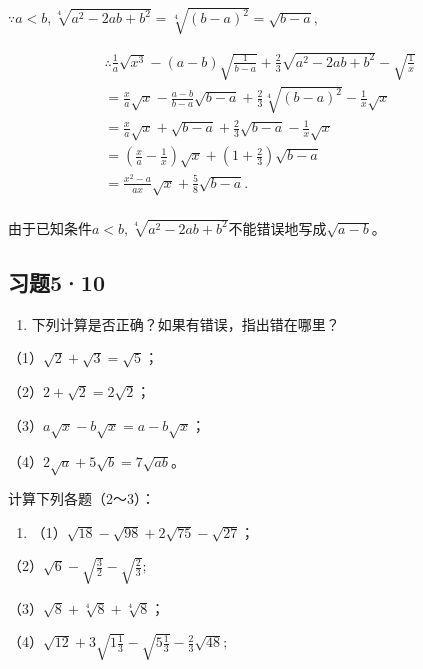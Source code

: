 \(\because a < b, \sqrt[4]{a^2 - 2ab + b^2} = \sqrt[4]{(b - a)^2} = \sqrt{b - a},\)

\[
\begin{array}{l} \therefore \frac{1}{a} \sqrt {x ^ {3}} - (a - b) \sqrt {\frac{1}{b - a}} + \frac{2}{3} \sqrt {a ^ {2} - 2 a b + b ^ {2}} - \sqrt {\frac{1}{x}} \\ = \frac{x}{a} \sqrt {x} - \frac{a - b}{b - a} \sqrt {b - a} + \frac{2}{3} \sqrt[4]{(b - a) ^ {2}} - \frac{1}{x} \sqrt {x} \\ = \frac{x}{a} \sqrt {x} + \sqrt {b - a} + \frac{2}{3} \sqrt {b - a} - \frac{1}{x} \sqrt {x} \\ = \left(\frac{x}{a} - \frac{1}{x}\right) \sqrt {x} + \left(1 + \frac{2}{3}\right) \sqrt {b - a} \\ = \frac{x ^ {2} - a}{a x} \sqrt {x} + \frac{5}{8} \sqrt {b - a}. \\ \end{array}
\]

由于已知条件\(a < b, \sqrt[4]{a^2 - 2ab + b^2}\)不能错误地写成\(\sqrt{a - b}\)。

\subsection{习题5·10}

\begin{enumerate}
\item
  下列计算是否正确？如果有错误，指出错在哪里？
\end{enumerate}

（1）\(\sqrt{2} + \sqrt{3} = \sqrt{5}\)；

（2）\(2 + \sqrt{2} = 2\sqrt{2}\)；

（3）\(a\sqrt{x} - b\sqrt{x} = a - b\sqrt{x}\)；

（4）\(2\sqrt{a} + 5\sqrt{b} = 7\sqrt{ab}\)。

计算下列各题（2～3）：

\begin{enumerate}[start=2]
\item
  （1）\(\sqrt{18} - \sqrt{98} + 2\sqrt{75} - \sqrt{27}\)；
\end{enumerate}

（2）\(\sqrt{6} - \sqrt{\frac{3}{2}} - \sqrt{\frac{2}{3}};\)

（3）\(\sqrt{8} + \sqrt[4]{8} + \sqrt[4]{8}\)；

（4）\(\sqrt{12} + 3\sqrt{1\frac{1}{3}} - \sqrt{5\frac{1}{3}} - \frac{2}{3}\sqrt{48};\)

